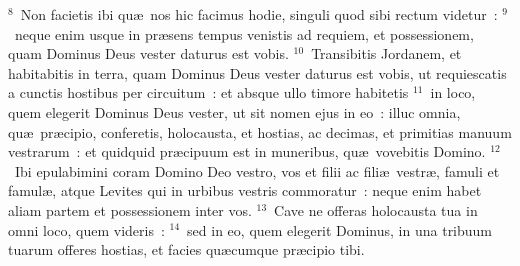 ${}^{8}$~Non facietis ibi qu\ae\ nos hic facimus hodie, singuli quod sibi rectum videtur~:
${}^{9}$~neque enim usque in pr\ae sens tempus venistis ad requiem, et possessionem, quam Dominus Deus vester daturus est vobis.
${}^{10}$~Transibitis Jordanem, et habitabitis in terra, quam Dominus Deus vester daturus est vobis, ut requiescatis a cunctis hostibus per circuitum~: et absque ullo timore habitetis
${}^{11}$~in loco, quem elegerit Dominus Deus vester, ut sit nomen ejus in eo~: illuc omnia, qu\ae\ pr\ae cipio, conferetis, holocausta, et hostias, ac decimas, et primitias manuum vestrarum~: et quidquid pr\ae cipuum est in muneribus, qu\ae\ vovebitis Domino.
${}^{12}$~Ibi epulabimini coram Domino Deo vestro, vos et filii ac fili\ae\ vestr\ae , famuli et famul\ae , atque Levites qui in urbibus vestris commoratur~: neque enim habet aliam partem et possessionem inter vos.
${}^{13}$~Cave ne offeras holocausta tua in omni loco, quem videris~:
${}^{14}$~sed in eo, quem elegerit Dominus, in una tribuum tuarum offeres hostias, et facies qu\ae cumque pr\ae cipio tibi.


